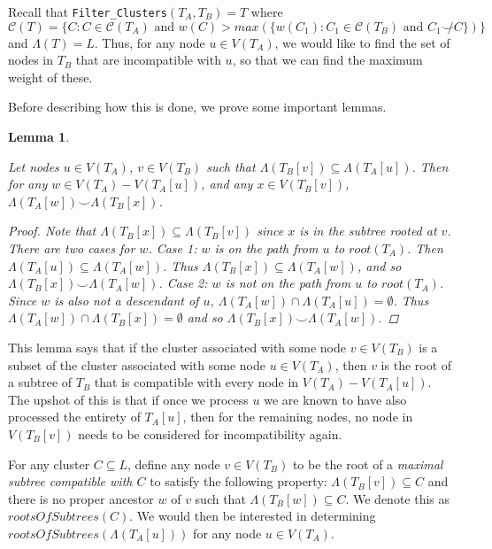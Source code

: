 \documentclass{article}
\newcommand{\compatible}{\smile}
\newcommand{\leafset}{\Lambda}
\newtheorem{filterclusterssubsetcompatible}[incompatibility]{Lemma}
\begin{document}
    Recall that \texttt{Filter\_Clusters}$(T_A, T_B) = T$ where $\mathcal{C}(T) = \{C : C \in \mathcal{C}(T_A) \text{ and } w(C) > max(\{w(C_1) : C_1 \in \mathcal{C}(T_B) \text{ and } C_1 \not\compatible C\})\}$ and $\leafset(T) = L$. Thus, for any node $u \in V(T_A)$, we would like to find the set of nodes in $T_B$ that are incompatible with $u$, so that we can find the maximum weight of these.

    Before describing how this is done, we prove some important lemmas.

    \begin{filterclusterssubsetcompatible}
        \label{lem:filterclusterssubsetcompatible}

        Let nodes $u \in V(T_A)$, $v \in V(T_B)$ such that $\leafset(T_B[v]) \subseteq \leafset(T_A[u])$. Then for any $w \in V(T_A) - V(T_A[u])$, and any $x \in V(T_B[v])$, $\leafset(T_A[w]) \compatible \leafset(T_B[x])$.

        \begin{proof}
            Note that $\leafset(T_B[x]) \subseteq \leafset(T_B[v])$ since $x$ is in the subtree rooted at $v$. There are two cases for $w$. Case 1: $w$ is on the path from $u$ to $root(T_A)$. Then $\leafset(T_A[u]) \subseteq \leafset(T_A[w])$. Thus $\leafset(T_B[x]) \subseteq \leafset(T_A[w])$, and so $\leafset(T_B[x]) \compatible \leafset(T_A[w])$. Case 2: $w$ is not on the path from $u$ to $root(T_A)$. Since $w$ is also not a descendant of $u$, $\leafset(T_A[w]) \cap \leafset(T_A[u]) = \emptyset$. Thus $\leafset(T_A[w]) \cap \leafset(T_B[x]) = \emptyset$ and so $\leafset(T_B[x]) \compatible \leafset(T_A[w])$.
        \end{proof}
    \end{filterclusterssubsetcompatible}

    This lemma says that if the cluster associated with some node $v \in V(T_B)$ is a subset of the cluster associated with some node $u \in V(T_A)$, then $v$ is the root of a subtree of $T_B$ that is compatible with every node in $V(T_A) - V(T_A[u])$. The upshot of this is that if once we process $u$ we are known to have also processed the entirety of $T_A[u]$, then for the remaining nodes, no node in $V(T_B[v])$ needs to be considered for incompatibility again.

    For any cluster $C \subseteq L$, define any node $v \in V(T_B)$ to be the root of a \textit{maximal subtree compatible with $C$} to satisfy the following property: $\leafset(T_B[v]) \subseteq C$ and there is no proper ancestor $w$ of $v$ such that $\leafset(T_B[w]) \subseteq C$. We denote this as $rootsOfSubtrees(C)$. We would then be interested in determining $rootsOfSubtrees(\leafset(T_A[u]))$ for any node $u \in V(T_A)$.
\end{document}
